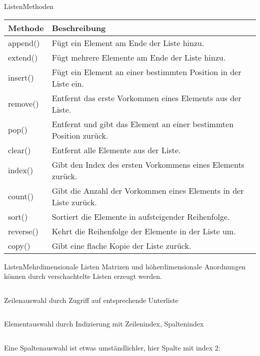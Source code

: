 \documentclass[xelatex,aspectratio=169]{beamer}
\begin{document}
\begin{frame}{Listen}{Methoden}
    \begin{tabularx}{\textwidth}{lX}
        \toprule
        \textbf{Methode} & \textbf{Beschreibung}                                              \\
        \midrule
        append()         & Fügt ein Element am Ende der Liste hinzu.                          \\
        extend()         & Fügt mehrere Elemente am Ende der Liste hinzu.                     \\
        insert()         & Fügt ein Element an einer bestimmten Position in der Liste ein.    \\
        remove()         & Entfernt das erste Vorkommen eines Elements aus der Liste.         \\
        pop()            & Entfernt und gibt das Element an einer bestimmten Position zurück. \\
        clear()          & Entfernt alle Elemente aus der Liste.                              \\
        index()          & Gibt den Index des ersten Vorkommens eines Elements zurück.        \\
        count()          & Gibt die Anzahl der Vorkommen eines Elements in der Liste zurück.  \\
        sort()           & Sortiert die Elemente in aufsteigender Reihenfolge.                \\
        reverse()        & Kehrt die Reihenfolge der Elemente in der Liste um.                \\
        copy()           & Gibt eine flache Kopie der Liste zurück.                           \\
        \bottomrule
    \end{tabularx}

\end{frame}

\begin{frame}{Listen}{Mehrdimensionale Listen}
    Matrizen und höherdimensionale Anordnungen können durch verschachtelte Listen erzeugt werden.
    \inputminted[lastline=2]{python}{src/listen_mehrdimensional.py}

    Zeilenauswahl durch Zugriff auf entsprechende Unterliste
    \inputminted[firstline=4,lastline=4]{python}{src/listen_mehrdimensional.py}

    Elementauswahl durch Indizierung mit Zeilenindex, Spaltenindex
    \inputminted[firstline=6,lastline=6]{python}{src/listen_mehrdimensional.py}

    Eine Spaltenauswahl ist  etwas umständlichler, hier Spalte mit index 2:
    \inputminted[firstline=8,lastline=8]{python}{src/listen_mehrdimensional.py}
\end{frame}
\end{document}
